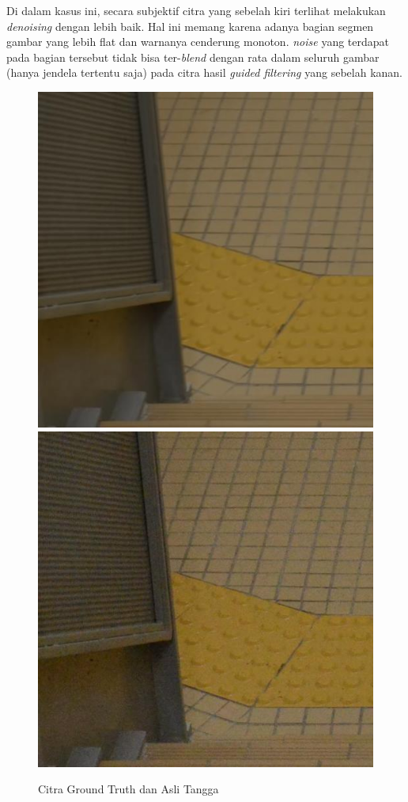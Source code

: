 \documentclass[11pt, a4paper, final]{report}
\begin{document}
Di dalam kasus ini, secara subjektif citra yang sebelah kiri terlihat melakukan \textit{denoising} dengan lebih baik. Hal ini memang karena adanya bagian segmen gambar yang lebih flat dan warnanya cenderung monoton. \textit{noise} yang terdapat pada bagian tersebut tidak bisa ter-\textit{blend} dengan rata dalam seluruh gambar (hanya jendela tertentu saja) pada citra hasil \textit{guided filtering} yang sebelah kanan.

\begin{figure}[H]
\centering
\includegraphics[scale=0.34]{assets/TanggaMean.JPG}
\includegraphics[scale=0.34]{assets/TanggaReal.JPG}
\caption{Citra Ground Truth dan Asli Tangga \cite{xu2018realworld}}
\end{figure}
\end{document}
